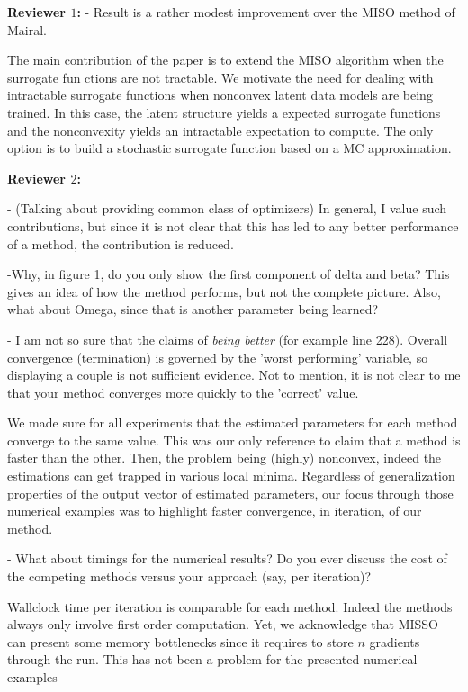 \documentclass{article}
\begin{document}
\textbf{Reviewer $1$:}
- Result is a rather modest improvement over the MISO method of Mairal.

The main contribution of the paper is to extend the MISO algorithm when the surrogate fun
ctions are not tractable. We motivate the need for dealing with intractable surrogate functions when nonconvex latent data models are being trained. In this case, the latent structure yields a expected surrogate functions and the nonconvexity yields an intractable expectation to compute. The only option is to build a stochastic surrogate function based on a MC approximation.

\textbf{Reviewer $2$:}

- (Talking about providing common class of optimizers) In general, I value such contributions, but since it is not clear that this has led to any better performance of a method, the contribution is reduced. 


-Why, in figure 1, do you only show the first component of delta and beta? This gives an idea of how the method performs, but not the complete picture. Also, what about Omega, since that is another parameter being learned?


- I am not so sure that the claims of \textit{being better} (for example line 228). Overall convergence (termination) is governed by the 'worst performing' variable, so displaying a couple is not sufficient evidence. Not to mention, it is not clear to me that your method converges more quickly to the 'correct' value.

We made sure for all experiments that the estimated parameters for each method converge to the same value. This was our only reference to claim that a method is faster than the other. Then, the problem being (highly) nonconvex, indeed the estimations can get trapped in various local minima. Regardless of generalization properties of the output vector of estimated parameters, our focus through those numerical examples was to highlight faster convergence, in iteration, of our method.

- What about timings for the numerical results? Do you ever discuss the cost of the competing methods versus your approach (say, per iteration)?

Wallclock time per iteration is comparable for each method. Indeed the methods always only involve first order computation. Yet, we acknowledge that MISSO can present some memory bottlenecks since it requires to store $n$ gradients through the run. This has not been a problem for the presented numerical examples
\end{document}
